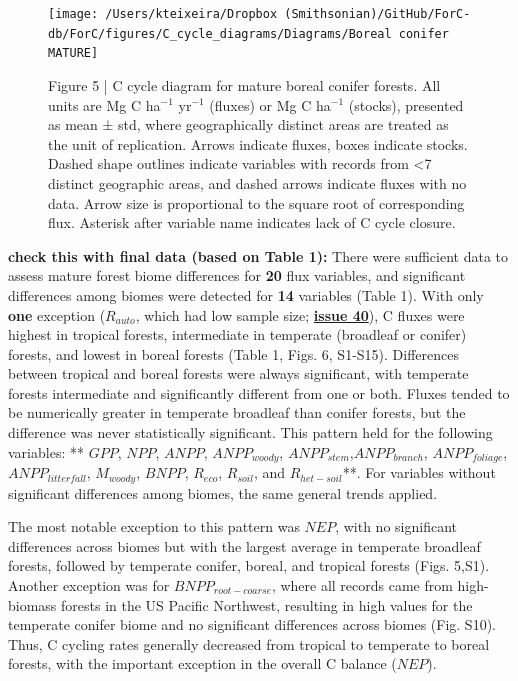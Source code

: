 \documentclass[
]{article}
\begin{document}
\begin{landscape}
\begin{figure}[H]

{\centering \texttt{[image: /Users/kteixeira/Dropbox (Smithsonian)/GitHub/ForC-db/ForC/figures/C\_cycle\_diagrams/Diagrams/Boreal conifer MATURE]} 

}

\caption{Figure 5 | C cycle diagram for mature boreal conifer forests. All units are Mg C ha$^{-1}$ yr$^{-1}$ (fluxes) or Mg C ha$^{-1}$ (stocks), presented as mean ± std, where geographically distinct areas are treated as the unit of replication.  Arrows indicate fluxes, boxes indicate stocks. Dashed shape outlines indicate variables with records from <7 distinct geographic areas, and dashed arrows indicate fluxes with no data. Arrow size is proportional to the square root of corresponding flux. Asterisk after variable name indicates lack of C cycle closure.}\label{fig:unnamed-chunk-11}
\end{figure}
\end{landscape}

\textbf{check this with final data (based on Table 1):} There were
sufficient data to assess mature forest biome differences for
\textbf{20} flux variables, and significant differences among biomes
were detected for \textbf{14} variables (Table 1). With only
\textbf{one} exception (\(R_{auto}\), which had low sample size;
\textbf{\href{https://github.com/forc-db/ERL-review/issues/40}{issue
40}}), C fluxes were highest in tropical forests, intermediate in
temperate (broadleaf or conifer) forests, and lowest in boreal forests
(Table 1, Figs. 6, S1-S15). Differences between tropical and boreal
forests were always significant, with temperate forests intermediate and
significantly different from one or both. Fluxes tended to be
numerically greater in temperate broadleaf than conifer forests, but the
difference was never statistically significant. This pattern held for
the following variables: ** \(GPP\), \(NPP\), \(ANPP\),
\(ANPP_{woody}\), \(ANPP_{stem}\),\(ANPP_{branch}\), \(ANPP_{foliage}\),
\(ANPP_{litterfall}\), \(M_{woody}\), \(BNPP\), \(R_{eco}\),
\(R_{soil}\), and \(R_{het-soil}\)**. For variables without significant
differences among biomes, the same general trends applied.

The most notable exception to this pattern was \(NEP\), with no
significant differences across biomes but with the largest average in
temperate broadleaf forests, followed by temperate conifer, boreal, and
tropical forests (Figs. 5,S1). Another exception was for
\(BNPP_{root-coarse}\), where all records came from high-biomass forests
in the US Pacific Northwest, resulting in high values for the temperate
conifer biome and no significant differences across biomes (Fig. S10).\\
Thus, C cycling rates generally decreased from tropical to temperate to
boreal forests, with the important exception in the overall C balance
(\(NEP\)).
\end{document}
